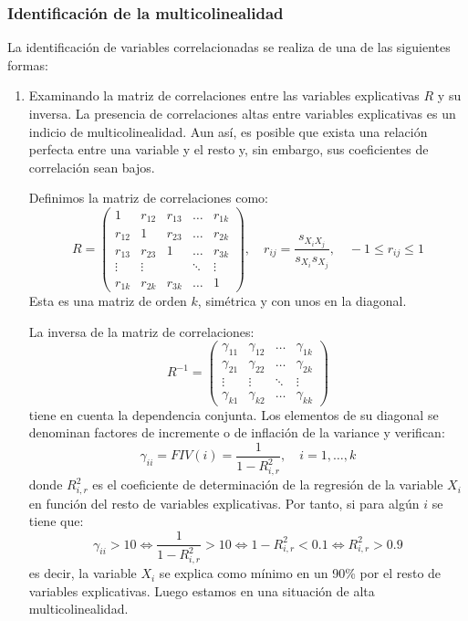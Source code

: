 \documentclass{report}
\theoremstyle{remark}
\theoremstyle{remark}
\theoremstyle{remark}
\theoremstyle{definition}
\theoremstyle{definition}
\theoremstyle{definition}
\begin{document}
\subsubsection*{Identificación de la multicolinealidad}
La identificación de variables correlacionadas se realiza de una de las siguientes formas:
\begin{enumerate}
    \item Examinando la matriz de correlaciones entre las variables explicativas $R$ y su inversa.
          La presencia de correlaciones altas entre variables explicativas es un indicio de multicolinealidad.
          Aun así, es posible que exista una relación perfecta entre una variable y el resto y, sin embargo, sus coeficientes de correlación sean bajos.

          Definimos la matriz de correlaciones como:
          $$R = \begin{pmatrix}
                  1      & r_{12} & r_{13} & \dots  & r_{1k} \\
                  r_{12} & 1      & r_{23} & \dots  & r_{2k} \\
                  r_{13} & r_{23} & 1      & \dots  & r_{3k} \\
                  \vdots & \vdots &        & \ddots & \vdots \\
                  r_{1k} & r_{2k} & r_{3k} & \dots  & 1
              \end{pmatrix}, \quad r_{ij} = \frac{s_{X_iX_j}}{s_{X_i}s_{X_j}}, \quad -1 \leq r_{ij} \leq 1$$
          Esta es una matriz de orden $k$, simétrica y con unos en la diagonal.

          La inversa de la matriz de correlaciones:
          $$R^{-1} = \begin{pmatrix}
                  \gamma_{11} & \gamma_{12} & \dots  & \gamma_{1k} \\
                  \gamma_{21} & \gamma_{22} & \dots  & \gamma_{2k} \\
                  \vdots      & \vdots      & \ddots & \vdots      \\
                  \gamma_{k1} & \gamma_{k2} & \dots  & \gamma_{kk}
              \end{pmatrix}$$
          tiene en cuenta la dependencia conjunta.
          Los elementos de su diagonal se denominan factores de incremente o de inflación de la variance y verifican:
          $$\gamma_{ii} = FIV(i) = \frac{1}{1-R^2_{i,r}}, \quad i = 1, \dots, k$$
          donde $R^2_{i,r}$ es el coeficiente de determinación de la regresión de la variable $X_i$ en función del resto de variables explicativas.
          Por tanto, si para algún $i$ se tiene que:
          $$\gamma_{ii} > 10 \Leftrightarrow \frac{1}{1-R^2_{i,r}} > 10 \Leftrightarrow 1 - R^2_{i,r} < 0.1 \Leftrightarrow R^2_{i,r} > 0.9$$
          es decir, la variable $X_i$ se explica como mínimo en un 90\% por el resto de variables explicativas.
          Luego estamos en una situación de alta multicolinealidad.


\end{enumerate}
\end{document}
